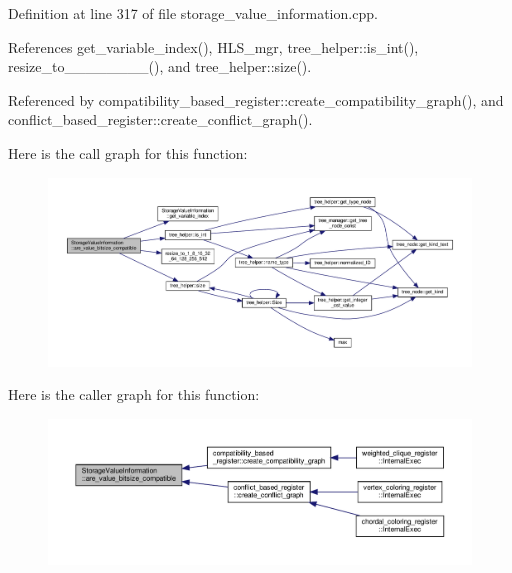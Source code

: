 Definition at line 317 of file storage\+\_\+value\+\_\+information.\+cpp.



References get\+\_\+variable\+\_\+index(), H\+L\+S\+\_\+mgr, tree\+\_\+helper\+::is\+\_\+int(), resize\+\_\+to\+\_\+\_\+\_\+\_\+\_\+\_\+\_\+\_(), and tree\+\_\+helper\+::size().



Referenced by compatibility\+\_\+based\+\_\+register\+::create\+\_\+compatibility\+\_\+graph(), and conflict\+\_\+based\+\_\+register\+::create\+\_\+conflict\+\_\+graph().

Here is the call graph for this function\+:
\nopagebreak
\begin{figure}[H]
\begin{center}
\leavevmode
\includegraphics[width=350pt]{d8/dbe/classStorageValueInformation_a72bff182397c1bb40391d4709a30d1ce_cgraph}
\end{center}
\end{figure}
Here is the caller graph for this function\+:
\nopagebreak
\begin{figure}[H]
\begin{center}
\leavevmode
\includegraphics[width=350pt]{d8/dbe/classStorageValueInformation_a72bff182397c1bb40391d4709a30d1ce_icgraph}
\end{center}
\end{figure}
\mbox{\label{classStorageValueInformation_a7ed7b636cee9a94fcfeecab58c73f2bc}} 
